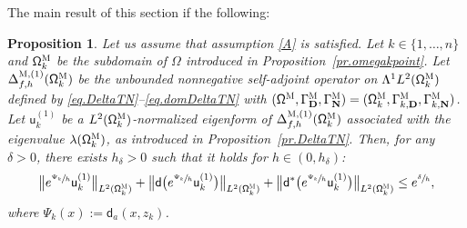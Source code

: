 \documentclass[JEP,XML,SOM,Unicode,NoEqCountersInSection,NoFloatCountersInSection,published]{cedram}
\newcommand{\mbf}[1]{\mathbf{#1}}
\theoremstyle{plain}
\newtheorem{proposition}{Proposition}
\theoremstyle{definition}
\begin{document}
The main result of this section if the following:

\skpt
\begin{proposition}
\label{pr.Agmon}
Let us assume that assumption \ref{A} is satisfied. Let
$k\in\{1,\ldots,n\}$ and $ \mathsf \Omega_k^{\textsc{M}} $ be the
subdomain of $\Omega$ introduced in Proposition~\ref{pr.omegakpoint}. Let $\Delta_{f,h}^{\textsc{M}, (1)}(\mathsf \Omega_k^{\textsc{M}})$ be the unbounded
nonnegative self-adjoint operator on
$ \Lambda^1L^{2} (\mathsf \Omega_k^{\textsc{M}})$ defined by \eqref{eq.DeltaTN}--\eqref{eq.domDeltaTN} with $(\mathsf \Omega^{\textsc{M}}, \Gamma^{\textsc{M}}_{\mbf D}, \Gamma^{\textsc{M}}_{\mbf N}) = (\mathsf \Omega_k^{\textsc{M}}, \Gamma_{k,\mbf D}^{\textsc{M}}, \Gamma_{k,\mbf N}^{\textsc{M}})$.
Let $\mathsf u^{(1)}_k$ be a $L^2(\mathsf
\Omega_k^{\textsc{M}})$-normalized eigenform of $
\Delta_{f,h}^{\textsc{M},(1)} (\mathsf \Omega_k^{\textsc{M}}) $
associated with the eigenvalue $\lambda(\mathsf
\Omega_k^{\textsc{M}})$, as introduced in Proposition~\ref{pr.DeltaTN}.
Then, for any $\delta>0$, there exists $h_\delta>0$ such that it holds for $h\in (0,h_\delta)$:
\[
\big\|e^{\sfrac{\Psi_k}{ h}} \mathsf u^{(1)}_k\big\|_{ L^{2} (\mathsf \Omega_k^{\textsc{M}})}
+\big\|\mathsf d \bigl(e^{\sfrac{ \Psi_k}{ h}} \mathsf u^{(1)}_k\bigr) \big\|_{ L^{2} (\mathsf \Omega_k^{\textsc{M}})}+\big\|\mathsf d^*\bigl(e^{\sfrac{ \Psi_k}{ h}} \mathsf u^{(1)}_k\bigr) \big\|_{ L^{2} (\mathsf \Omega_k^{\textsc{M}})}
\le e^{\sfrac \delta h},
\]
where $\Psi_k(x):=\mathsf d_a(x,z_k)$.
\end{proposition}
\end{document}
